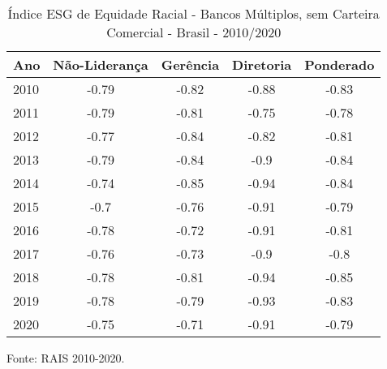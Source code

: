 \begin{table}[htb!]
\centering
\caption{Índice ESG de Equidade Racial - Bancos Múltiplos, sem Carteira Comercial - Brasil - 2010/2020}
\begin{tabular}{lcccc}
\hline
    Ano  & Não-Liderança & Gerência & Diretoria & Ponderado \\ \hline
    2010 & -0.79          & -0.82    & -0.88     & -0.83    \\ 
    2011 & -0.79          & -0.81    & -0.75     & -0.78    \\ 
    2012 & -0.77          & -0.84    & -0.82     & -0.81    \\ 
    2013 & -0.79          & -0.84    & -0.9      & -0.84    \\ 
    2014 & -0.74          & -0.85    & -0.94     & -0.84    \\ 
    2015 & -0.7           & -0.76    & -0.91     & -0.79    \\ 
    2016 & -0.78          & -0.72    & -0.91     & -0.81    \\ 
    2017 & -0.76          & -0.73    & -0.9      & -0.8     \\ 
    2018 & -0.78          & -0.81    & -0.94     & -0.85    \\ 
    2019 & -0.78          & -0.79    & -0.93     & -0.83    \\ 
    2020 & -0.75          & -0.71    & -0.91     & -0.79    \\ \hline
\end{tabular}
\begin{floatnotes}
\item [Fonte:] RAIS 2010-2020.
\end{floatnotes}
\end{table}